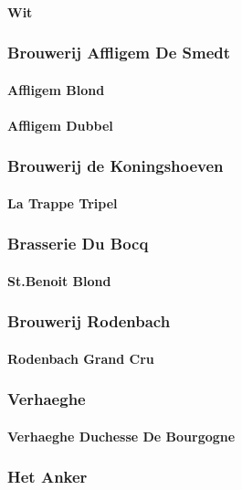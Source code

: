 \documentclass[11pt]{article}
\begin{document}
\paragraph{Wit}
\label{sec:orgb1ff3ae}
\subsubsection{Brouwerij Affligem De Smedt}
\label{sec:orgce81540}
\paragraph{Affligem Blond}
\label{sec:orgc44a17d}
\paragraph{Affligem Dubbel}
\label{sec:org2fda3e8}
\subsubsection{Brouwerij de Koningshoeven}
\label{sec:org572a8df}
\paragraph{La Trappe Tripel}
\label{sec:org957bdf2}
\subsubsection{Brasserie Du Bocq}
\label{sec:orgd1fc1c5}
\paragraph{St.Benoit Blond}
\label{sec:orga9284d3}
\subsubsection{Brouwerij Rodenbach}
\label{sec:orgd282fcd}
\paragraph{Rodenbach Grand Cru}
\label{sec:org0c962ce}
\subsubsection{Verhaeghe}
\label{sec:org6cac5e1}
\paragraph{Verhaeghe Duchesse De Bourgogne}
\label{sec:org76783b1}
\subsubsection{Het Anker}
\label{sec:org23b9b52}
\end{document}

